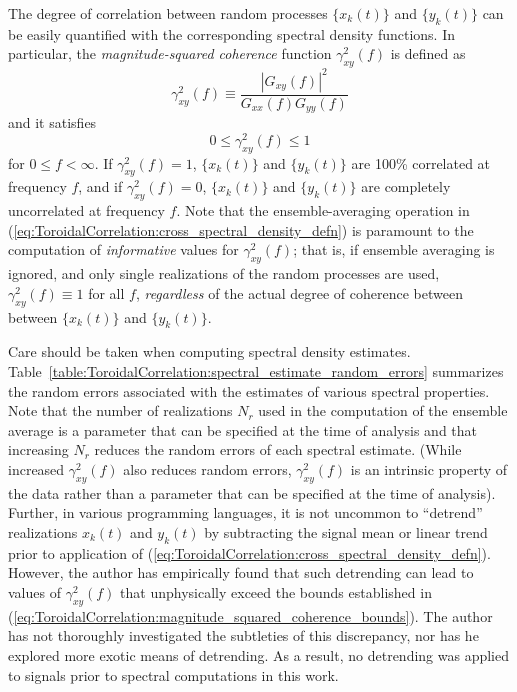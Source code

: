The degree of correlation between random processes
$\{x_k(t)\}$ and $\{y_k(t)\}$ can be easily quantified
with the corresponding spectral density functions.
In particular, the \emph{magnitude-squared coherence} function
$\gamma_{xy}^2(f)$ is defined as
\begin{equation}
  \gamma_{xy}^2(f)
  \equiv
  \frac{|G_{xy}(f)|^2}{G_{xx}(f) G_{yy}(f)}
  \label{eq:ToroidalCorrelation:magnitude_squared_coherence_defn}
\end{equation}
and it satisfies
\begin{equation}
  0 \leq \gamma_{xy}^2(f) \leq 1
  \label{eq:ToroidalCorrelation:magnitude_squared_coherence_bounds}
\end{equation}
for $0 \leq f < \infty$.
If $\gamma_{xy}^2(f) = 1$,
$\{x_k(t)\}$ and $\{y_k(t)\}$ are 100\% correlated at frequency $f$, and
if $\gamma_{xy}^2(f) = 0$,
$\{x_k(t)\}$ and $\{y_k(t)\}$ are completely uncorrelated at frequency $f$.
Note that the ensemble-averaging operation in
(\ref{eq:ToroidalCorrelation:cross_spectral_density_defn})
is paramount to the computation
of \emph{informative} values for $\gamma_{xy}^2(f)$;
that is, if ensemble averaging is ignored, and
only single realizations of the random processes are used,
$\gamma_{xy}^2(f) \equiv 1$ for all $f$,
\emph{regardless} of the actual degree of coherence
between between $\{x_k(t)\}$ and $\{y_k(t)\}$.

Care should be taken when computing spectral density estimates.
Table~\ref{table:ToroidalCorrelation:spectral_estimate_random_errors}
summarizes the random errors associated with the estimates
of various spectral properties.
Note that the number of realizations $N_r$ used
in the computation of the ensemble average
is a parameter that can be specified
at the time of analysis and that
increasing $N_r$ reduces the random errors of each spectral estimate.
(While increased $\gamma_{xy}^2(f)$ also reduces random errors,
$\gamma_{xy}^2(f)$ is an intrinsic property of the data
rather than a parameter that can be specified at the time of analysis).
Further, in various programming languages,
it is not uncommon to ``detrend'' realizations $x_k(t)$ and $y_k(t)$
by subtracting the signal mean or linear trend
prior to application of
(\ref{eq:ToroidalCorrelation:cross_spectral_density_defn}).
However, the author has empirically found that
such detrending can lead to values of $\gamma_{xy}^2(f)$
that unphysically exceed the bounds established in
(\ref{eq:ToroidalCorrelation:magnitude_squared_coherence_bounds}).
The author has not thoroughly investigated the subtleties of this discrepancy,
nor has he explored more exotic means of detrending.
As a result, no detrending was applied to signals
prior to spectral computations in this work.

